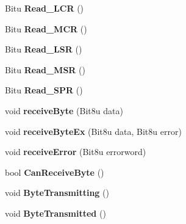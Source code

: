 \begin{DoxyCompactItemize}
\item 
\hypertarget{classCSerial_a9230f233f929e4f5b3154e662e3cb036}{Bitu {\bfseries Read\-\_\-\-L\-C\-R} ()}\label{classCSerial_a9230f233f929e4f5b3154e662e3cb036}

\item 
\hypertarget{classCSerial_aae3106549bad8f18adf37f1bacedbeff}{Bitu {\bfseries Read\-\_\-\-M\-C\-R} ()}\label{classCSerial_aae3106549bad8f18adf37f1bacedbeff}

\item 
\hypertarget{classCSerial_a2e52058acec7f6c4b85d6f0430abdae0}{Bitu {\bfseries Read\-\_\-\-L\-S\-R} ()}\label{classCSerial_a2e52058acec7f6c4b85d6f0430abdae0}

\item 
\hypertarget{classCSerial_a0e6ef678c9c62a8eb4ba407ad57a2d44}{Bitu {\bfseries Read\-\_\-\-M\-S\-R} ()}\label{classCSerial_a0e6ef678c9c62a8eb4ba407ad57a2d44}

\item 
\hypertarget{classCSerial_af1f36573bdc16f3510a75546f2d58a58}{Bitu {\bfseries Read\-\_\-\-S\-P\-R} ()}\label{classCSerial_af1f36573bdc16f3510a75546f2d58a58}

\item 
\hypertarget{classCSerial_a5a1977acc7ff580f49ac990783ed96b6}{void {\bfseries receive\-Byte} (Bit8u data)}\label{classCSerial_a5a1977acc7ff580f49ac990783ed96b6}

\item 
\hypertarget{classCSerial_afc7997bc5defdcb8c6c0a9ec094bf134}{void {\bfseries receive\-Byte\-Ex} (Bit8u data, Bit8u error)}\label{classCSerial_afc7997bc5defdcb8c6c0a9ec094bf134}

\item 
\hypertarget{classCSerial_a8c25f1946470adb7ab00b2abeee3008f}{void {\bfseries receive\-Error} (Bit8u errorword)}\label{classCSerial_a8c25f1946470adb7ab00b2abeee3008f}

\item 
\hypertarget{classCSerial_a6005dc8c0bc391f28f32b73600da9877}{bool {\bfseries Can\-Receive\-Byte} ()}\label{classCSerial_a6005dc8c0bc391f28f32b73600da9877}

\item 
\hypertarget{classCSerial_a755578de0eeb57a61afee794d7cf6cab}{void {\bfseries Byte\-Transmitting} ()}\label{classCSerial_a755578de0eeb57a61afee794d7cf6cab}

\item 
\hypertarget{classCSerial_a1d24de2135b2cccc2733cf96f57203c7}{void {\bfseries Byte\-Transmitted} ()}\label{classCSerial_a1d24de2135b2cccc2733cf96f57203c7}


\end{DoxyCompactItemize}
